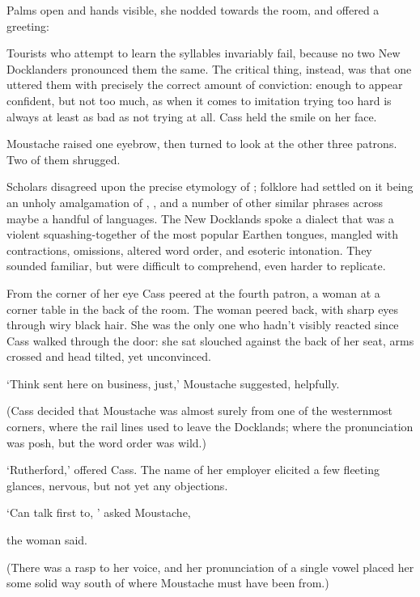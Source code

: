Palms open and hands visible, she nodded towards the room, and offered
a greeting:


Tourists who attempt to learn the syllables invariably fail, because
no two New Docklanders pronounced them the same. The critical thing,
instead, was that one uttered them with precisely the correct amount
of conviction: enough to appear confident, but not too much, as when
it comes to imitation trying too hard is always at least as bad as not
trying at all. Cass held the smile on her face.

Moustache raised one eyebrow, then turned to look at the other three
patrons. Two of them shrugged.

Scholars disagreed upon the precise etymology of ;
folklore had settled on it being an unholy amalgamation of
, , and a number of
other similar phrases across maybe a handful of languages. The New
Docklands spoke a dialect that was a violent squashing-together of the
most popular Earthen tongues, mangled with contractions, omissions,
altered word order, and esoteric intonation. They sounded familiar,
but were difficult to comprehend, even harder to replicate.

From the corner of her eye Cass peered at the fourth patron, a woman at
a corner table in the back of the room. The woman peered back, with
sharp eyes through wiry black hair. She was the only one who hadn't
visibly reacted since Cass walked through the door: she sat slouched
against the back of her seat, arms crossed and head tilted, yet
unconvinced.

`Think sent here on business, just,' Moustache suggested, helpfully.

(Cass decided that Moustache was almost surely from one of the
westernmost corners, where the rail lines used to leave the Docklands;
where the pronunciation was posh, but the word order was wild.)

`Rutherford,' offered Cass. The name of her employer elicited a few
fleeting glances, nervous, but not yet any objections.

`Can talk first to, ' asked Moustache,

 the woman said.

(There was a rasp to her voice, and her pronunciation of a single
vowel placed her some solid way south of where Moustache must have
been from.)


